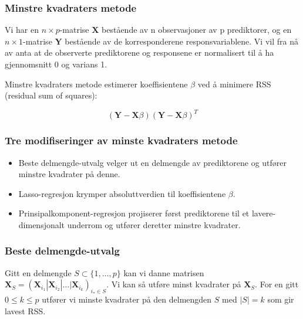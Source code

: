\documentclass[aspectratio=169]{beamer}
\begin{document}
\begin{frame}
  \frametitle{Minstre kvadraters metode}

  Vi har en \(n\times p\)-matrise \(\textbf{X}\) bestående av n observasjoner av p prediktorer, og en \(n\times 1\)-matrise \(\textbf{Y}\) bestående av de korresponderene responsvariablene. Vi vil fra nå av anta at de observerte prediktorene og responsene er normalisert til å ha gjennomsnitt 0 og varians 1.

  \pause

  Minstre kvadraters metode estimerer koeffisientene \(\beta\) ved å minimere RSS (residual sum of squares):

  \begin{equation}
    (\textbf{Y} - \textbf{X}\beta)(\textbf{Y} - \textbf{X}\beta)^T
  \end{equation}
\end{frame}

\begin{frame}
  \frametitle{Tre modifiseringer av minste kvadraters metode}
  \begin{itemize}
    \item Beste delmengde-utvalg velger ut en delmengde av prediktorene og utfører minstre kvadrater på denne.
    \pause
  \item Lasso-regresjon krymper absoluttverdien til koeffisientene \(\beta\).
    \pause
    \item Prinsipalkomponent-regresjon projiserer først prediktorene til et lavere-dimensjonalt underrom og utfører deretter minstre kvadrater.
  \end{itemize}
\end{frame}

\begin{frame}
  \frametitle{Beste delmengde-utvalg}
  Gitt en delmengde \(S \subset \{1,\dots,p\}\) kan vi danne matrisen \(\textbf{X}_S = (\textbf{X}_{i_1}|\textbf{X}_{i_2}|\dots |\textbf{X}_{i_k})_{i_* \in S}\).
  Vi kan så utføre minst kvadrater på \(\textbf{X}_S\).
  \pause
  For en gitt \(0 \leq k \leq p\) utfører vi minste kvadrater på den delmengden \(S\) med \(|S| = k\) som gir lavest RSS.
\end{frame}
\end{document}
